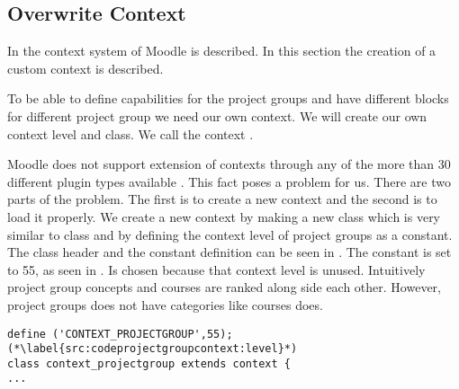 \subsection{Overwrite Context}
In   the context system of Moodle is described.
In this section the creation of a custom context is described. 

To be able to define capabilities for the project groups and have different blocks for different project group we need our own context.
We will create our own context level and class.
We call the context . 

Moodle does not support extension of contexts through any of the more than 30 different plugin types available \cite{plugin}. 
This fact poses a problem for us.
There are two parts of the problem.
The first is to create a new context and the second is to load it properly. 
We create a new context by making a new class which is very similar to  class and by defining the context level of project groups as a constant. 
The class header and the constant definition can be seen in . 
The constant is set to 55, as seen in .
Is chosen because that context level is unused.
Intuitively project group concepts and courses are ranked along side each other.
However, project groups does not have categories like courses does.

\begin{lstlisting}[style=phpCode, caption=\myCaption{The context\_projectgroup class header and constant definition}, label=src:codeprojectgroupcontext]
define ('CONTEXT_PROJECTGROUP',55); (*\label{src:codeprojectgroupcontext:level}*)
class context_projectgroup extends context {
...
\end{lstlisting}

